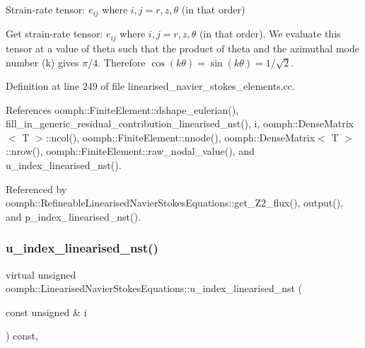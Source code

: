 Strain-\/rate tensor\+: $ e_{ij} $ where $ i,j = r,z,\theta $ (in that order) 

Get strain-\/rate tensor\+: $ e_{ij} $ where $ i,j = r,z,\theta $ (in that order). We evaluate this tensor at a value of theta such that the product of theta and the azimuthal mode number (k) gives $ \pi/4 $. Therefore $ \cos(k \theta) = \sin(k \theta) = 1/\sqrt{2} $. 

Definition at line 249 of file linearised\+\_\+navier\+\_\+stokes\+\_\+elements.\+cc.



References oomph\+::\+Finite\+Element\+::dshape\+\_\+eulerian(), fill\+\_\+in\+\_\+generic\+\_\+residual\+\_\+contribution\+\_\+linearised\+\_\+nst(), i, oomph\+::\+Dense\+Matrix$<$ T $>$\+::ncol(), oomph\+::\+Finite\+Element\+::nnode(), oomph\+::\+Dense\+Matrix$<$ T $>$\+::nrow(), oomph\+::\+Finite\+Element\+::raw\+\_\+nodal\+\_\+value(), and u\+\_\+index\+\_\+linearised\+\_\+nst().



Referenced by oomph\+::\+Refineable\+Linearised\+Navier\+Stokes\+Equations\+::get\+\_\+\+Z2\+\_\+flux(), output(), and p\+\_\+index\+\_\+linearised\+\_\+nst().

\mbox{\label{classoomph_1_1LinearisedNavierStokesEquations_a051bd3799c25d88c9b840f399cba6334}} 
\subsubsection{\texorpdfstring{u\+\_\+index\+\_\+linearised\+\_\+nst()}{u\_index\_linearised\_nst()}}
{\footnotesize\ttfamily virtual unsigned oomph\+::\+Linearised\+Navier\+Stokes\+Equations\+::u\+\_\+index\+\_\+linearised\+\_\+nst (\begin{DoxyParamCaption}\item[{const unsigned \&}]{i }\end{DoxyParamCaption}) const\hspace{0.3cm}{\ttfamily [inline]}, {\ttfamily [virtual]}}



